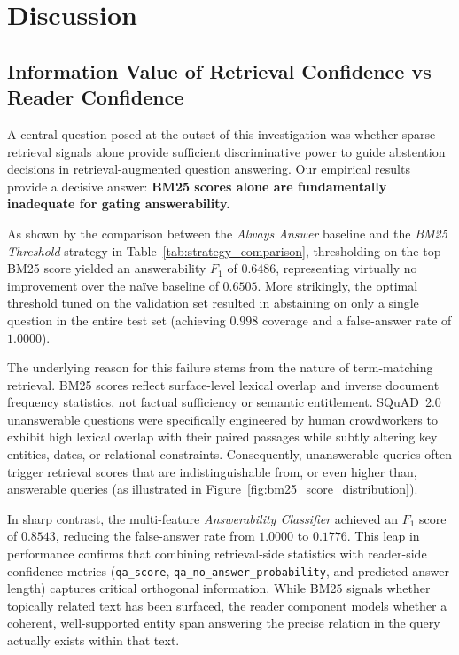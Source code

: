 \chapter{Discussion}
\label{chap:discussion}

\section{Information Value of Retrieval Confidence vs Reader Confidence}
\label{sec:disc_info_value}

A central question posed at the outset of this investigation was whether sparse retrieval signals alone provide sufficient discriminative power to guide abstention decisions in retrieval-augmented question answering. Our empirical results provide a decisive answer: \textbf{BM25 scores alone are fundamentally inadequate for gating answerability.}

As shown by the comparison between the \emph{Always Answer} baseline and the \emph{BM25 Threshold} strategy in Table~\ref{tab:strategy_comparison}, thresholding on the top BM25 score yielded an answerability $F_1$ of $0.6486$, representing virtually no improvement over the naïve baseline of $0.6505$. More strikingly, the optimal threshold tuned on the validation set resulted in abstaining on only a single question in the entire test set (achieving $0.998$ coverage and a false-answer rate of $1.0000$). 

The underlying reason for this failure stems from the nature of term-matching retrieval. BM25 scores reflect surface-level lexical overlap and inverse document frequency statistics, not factual sufficiency or semantic entitlement. SQuAD~2.0 unanswerable questions were specifically engineered by human crowdworkers to exhibit high lexical overlap with their paired passages while subtly altering key entities, dates, or relational constraints. Consequently, unanswerable queries often trigger retrieval scores that are indistinguishable from, or even higher than, answerable queries (as illustrated in Figure~\ref{fig:bm25_score_distribution}).

In sharp contrast, the multi-feature \emph{Answerability Classifier} achieved an $F_1$ score of $0.8543$, reducing the false-answer rate from $1.0000$ to $0.1776$. This leap in performance confirms that combining retrieval-side statistics with reader-side confidence metrics (\texttt{qa\_score}, \texttt{qa\_no\_answer\_probability}, and predicted answer length) captures critical orthogonal information. While BM25 signals whether topically related text has been surfaced, the reader component models whether a coherent, well-supported entity span answering the precise relation in the query actually exists within that text.

